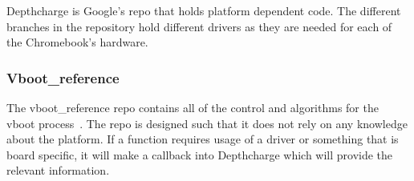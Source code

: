\documentclass[../report.tex]{subfiles}
\begin{document}
Depthcharge is Google's repo that holds platform dependent code.
The different branches in the repository hold different drivers as they are needed for each of the Chromebook's hardware.

\subsubsection{Vboot\_reference}

The vboot\_reference repo contains all of the control and algorithms for the vboot process~\cite{vboot-codebase}.
The repo is designed such that it does not rely on any knowledge about the platform.
If a function requires usage of a driver or something that is board specific, it will make a callback into Depthcharge which will provide the relevant information.
\end{document}
